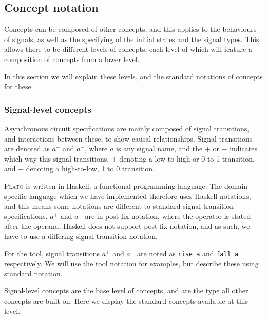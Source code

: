 \documentclass[british,conference,compsoc]{IEEEtran}
\newcommand{\noun}[1]{\textsc{#1}}
\begin{document}
\vspace{-3mm}

\subsection{Concept notation \label{sub:concept-notation}}

\vspace{-3mm}

Concepts can be composed of other concepts, and this applies to the behaviours 
of signals, as well as the specifying of the initial states and the signal 
types. This allows there to be different levels of concepts, each level of 
which will feature a composition of concepts from a lower level. 

In this section we will explain these levels, and the standard notations of 
concepts for these. 

\vspace{-2mm}

\subsubsection{\label{signal-level}Signal-level concepts}Asynchronous circuit 
specifications are mainly composed of signal transitions, and interactions 
between these, to show causal relationships. Signal transitions are denoted as 
$a^{+}$ and $a^{-}$, where $a$ is any signal name, and 
the $+$ or $-$ indicates which way this signal transitions, $+$ denoting a 
low-to-high or 0 to 1 transition, and $-$ denoting a high-to-low, 1 to 0 
transition. 

\noun{Plato} is written in Haskell, a functional programming language. The 
domain specific language which we have implemented therefore uses Haskell 
notations, and this means some notations are different to standard signal 
transition specifications. $a^{+}$ and $a^{-}$ are in post-fix notation, where 
the operator is stated after the operand. Haskell does not support post-fix 
notation, and as such, we have to use a differing signal transition notation. 

For the tool, signal transitions $a^{+}$ and $a^{-}$ are noted as \texttt{rise a} and 
\texttt{fall a} respectively. We will use the tool notation for examples, but 
describe these using standard notation.

Signal-level concepts are the base level of concepts, and are 
the type all other concepts are built on. Here we display the standard concepts
available at this level.
\end{document}
